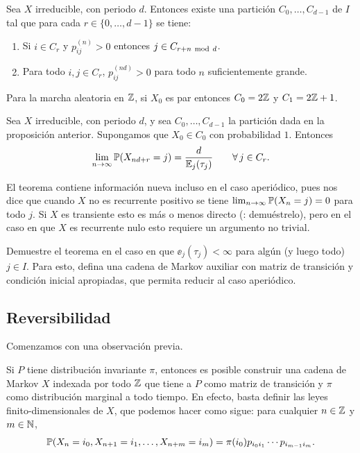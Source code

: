 \begin{prop}
Sea $X$ irreducible, con periodo $d$.
Entonces existe una partición $C_0,\dotsc,C_{d-1}$ de $I$ tal que para cada $r\in\{0,\dotsc,d-1\}$ se tiene:
\begin{enumerate}[label=\uptext{(\arabic*)}]
\item Si $i\in C_r$ y $p^{(n)}_{ij}>0$ entonces $j\in C_{r+n~\text{\upshape{mod}}~d}$.
\item Para todo $i,j\in C_r$, $p^{(nd)}_{ij}>0$ para todo $n$ suficientemente grande.
\end{enumerate}
\end{prop}

\begin{ex}
Para la marcha aleatoria en $\mathbb{Z}$, si $X_0$ es par entonces $C_0=2\mathbb{Z}$ y $C_1=2\mathbb{Z}+1$.
\end{ex}

\begin{thm}\label{thm:eq-gen}
Sea $X$ irreducible, con periodo $d$, y sea $C_0,\dotsc,C_{d-1}$ la partición dada en la proposición anterior.
Supongamos que $X_0\in C_0$ con probabilidad $1$.
Entonces
\[\lim_{n\to\infty}\mathbb{P}(X_{nd+r}=j)=\frac{d}{\mathbb{E}_j(\tau_j)}\qquad\forall\,j\in C_r.\]
\end{thm}

\begin{rem}
El teorema contiene información nueva incluso en el caso aperiódico, pues nos dice que cuando $X$ no es recurrente positivo se tiene $\lim_{n\to\infty}\mathbb{P}(X_{n}=j)=0$ para todo $j$.
Si $X$ es transiente esto es más o menos directo (\uexers: demuéstrelo), pero en el caso en que $X$ es recurrente nulo esto requiere un argumento no trivial.
\end{rem}

\begin{exer}
Demuestre el teorema en el caso en que $\ee_j(\tau_j)<\infty$ para algún (y luego todo) $j\in I$.
Para esto, defina una cadena de Markov auxiliar con matriz de transición y condición inicial apropiadas, que permita reducir al caso aperiódico.
\end{exer}

\subsection{Reversibilidad}

Comenzamos con una observación previa.

\begin{rem}\label{rem:rev}
Si $P$ tiene distribución invariante $\pi$, entonces es posible construir una cadena de Markov $X$ indexada por todo $\mathbb{Z}$ que tiene a $P$ como matriz de transición y $\pi$ como distribución marginal a todo tiempo.
En efecto, basta definir las leyes finito-dimensionales de $X$, que podemos hacer como sigue: para cualquier $n\in\mathbb{Z}$ y $m\in\mathbb{N}$,
\[\mathbb{P}(X_n=i_0,X_{n+1}=i_1,\dotsc,X_{n+m}=i_m)=\pi(i_0)p_{i_0i_1}\dotsm p_{i_{m-1}i_m}.\]
\end{rem}

